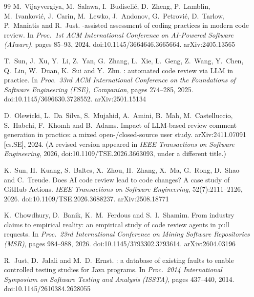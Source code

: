 \documentclass[11pt,a4paper]{article}
\begin{document}
\begin{thebibliography}{99}
M.~Vijayvergiya, M.~Salawa, I.~Budiseli\'c, D.~Zheng, P.~Lamblin,
M.~Ivankovi\'c, J.~Carin, M.~Lewko, J.~Andonov, G.~Petrovi\'c, D.~Tarlow,
P.~Maniatis and R.~Just.
-assisted assessment of coding practices in modern code review.
\newblock In \emph{Proc.\ 1st ACM International Conference on AI-Powered
Software (AIware)}, pages 85--93, 2024.
\newblock doi:10.1145/3664646.3665664. arXiv:2405.13565

T.~Sun, J.~Xu, Y.~Li, Z.~Yan, G.~Zhang, L.~Xie, L.~Geng, Z.~Wang, Y.~Chen,
Q.~Lin, W.~Duan, K.~Sui and Y.~Zhu.
: automated code review via {LLM} in practice.
\newblock In \emph{Proc.\ 33rd ACM International Conference on the
Foundations of Software Engineering (FSE), Companion}, pages 274--285, 2025.
\newblock doi:10.1145/3696630.3728552. arXiv:2501.15134

D.~Olewicki, L.~Da~Silva, S.~Mujahid, A.~Amini, B.~Mah, M.~Castelluccio,
S.~Habchi, F.~Khomh and B.~Adams.
\newblock Impact of {LLM}-based review comment generation in practice: a
mixed open-/closed-source user study.
\newblock arXiv:2411.07091 [cs.SE], 2024. (A revised version appeared in
\emph{IEEE Transactions on Software Engineering}, 2026,
doi:10.1109/TSE.2026.3663093, under a different title.)

K.~Sun, H.~Kuang, S.~Baltes, X.~Zhou, H.~Zhang, X.~Ma, G.~Rong, D.~Shao and
C.~Treude.
\newblock Does {AI} code review lead to code changes? {A} case study of
{GitHub} {A}ctions.
\newblock \emph{IEEE Transactions on Software Engineering}, 52(7):2111--2126,
2026.
\newblock doi:10.1109/TSE.2026.3688237. arXiv:2508.18771

K.~Chowdhury, D.~Banik, K.~M.~Ferdous and S.~I.~Shamim.
\newblock From industry claims to empirical reality: an empirical study of
code review agents in pull requests.
\newblock In \emph{Proc.\ 23rd International Conference on Mining Software
Repositories (MSR)}, pages 984--988, 2026.
\newblock doi:10.1145/3793302.3793614. arXiv:2604.03196

R.~Just, D.~Jalali and M.~D.~Ernst.
: a database of existing faults to enable controlled
testing studies for {J}ava programs.
\newblock In \emph{Proc.\ 2014 International Symposium on Software Testing
and Analysis (ISSTA)}, pages 437--440, 2014.
\newblock doi:10.1145/2610384.2628055


\end{thebibliography}
\end{document}
